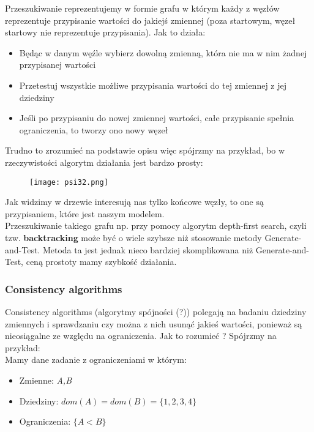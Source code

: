 \documentclass[a4paper,15pt]{article}
\begin{document}
Przeszukiwanie reprezentujemy w formie grafu w którym każdy z węzłów reprezentuje przypisanie wartości do jakiejś zmiennej (poza startowym, węzeł startowy nie reprezentuje przypisania). Jak to działa:
\begin{itemize}
\item Będąc w danym węźle wybierz dowolną zmienną, która nie ma w nim żadnej przypisanej wartości
\item Przetestuj wszystkie możliwe przypisania wartości do tej zmiennej z jej dziedziny
\item Jeśli po przypisaniu do nowej zmiennej wartości, całe przypisanie spełnia ograniczenia, to tworzy ono nowy węzeł
\end{itemize} 

Trudno to zrozumieć na podstawie opisu więc spójrzmy na przykład, bo w rzeczywistości algorytm działania jest bardzo prosty:

\begin{figure}[H]
\centerline{\texttt{[image: psi32.png]}}
\end{figure}

Jak widzimy w drzewie interesują nas tylko końcowe węzły, to one są przypisaniem, które jest naszym modelem. \\

Przeszukiwanie takiego grafu np. przy pomocy algorytm depth-first search, czyli tzw. \textbf{backtracking} może być o wiele szybsze niż stosowanie metody Generate-and-Test. Metoda ta jest jednak nieco bardziej skomplikowana niż Generate-and-Test, ceną prostoty mamy szybkość działania. 

 
\subsubsection{Consistency algorithms}

Consistency algorithms (algorytmy spójności (?)) polegają na badaniu dziedziny zmiennych i sprawdzaniu czy można z nich usunąć jakieś wartości, ponieważ są nieosiągalne ze względu na ograniczenia. Jak to rozumieć ? Spójrzmy na przykład: \\

Mamy dane zadanie z ograniczeniami w którym:
\begin{itemize}
\item Zmienne: \textit{A,B}
\item Dziedziny: $dom(A)=dom(B)=\{1,2,3,4\}$
\item Ograniczenia: $\{A<B\}$
\end{itemize}
\end{document}
